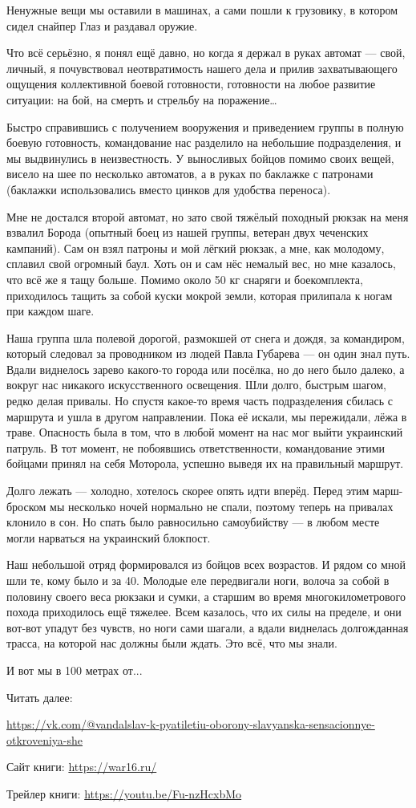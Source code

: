 Ненужные вещи мы оставили в машинах, а сами пошли к грузовику, в котором сидел
снайпер Глаз и раздавал оружие.

Что всё серьёзно, я понял ещё давно, но когда я держал в руках автомат — свой,
личный, я почувствовал неотвратимость нашего дела и прилив захватывающего
ощущения коллективной боевой готовности, готовности на любое развитие ситуации:
на бой, на смерть и стрельбу на поражение…

Быстро справившись с получением вооружения и приведением группы в полную боевую
готовность, командование нас разделило на небольшие подразделения, и мы
выдвинулись в неизвестность. У выносливых бойцов помимо своих вещей, висело на
шее по несколько автоматов, а в руках по баклажке с патронами (баклажки
использовались вместо цинков для удобства переноса).

Мне не достался второй автомат, но зато свой тяжёлый походный рюкзак на меня
взвалил Борода (опытный боец из нашей группы, ветеран двух чеченских кампаний).
Сам он взял патроны и мой лёгкий рюкзак, а мне, как молодому, сплавил свой
огромный баул. Хоть он и сам нёс немалый вес, но мне казалось, что всё же я
тащу больше. Помимо около 50 кг снаряги и боекомплекта, приходилось тащить за
собой куски мокрой земли, которая прилипала к ногам при каждом шаге.

Наша группа шла полевой дорогой, размокшей от снега и дождя, за командиром,
который следовал за проводником из людей Павла Губарева — он один знал путь.
Вдали виднелось зарево какого-то города или посёлка, но до него было далеко, а
вокруг нас никакого искусственного освещения. Шли долго, быстрым шагом, редко
делая привалы. Но спустя какое-то время часть подразделения сбилась с маршрута
и ушла в другом направлении. Пока её искали, мы пережидали, лёжа в траве.
Опасность была в том, что в любой момент на нас мог выйти украинский патруль. В
тот момент, не побоявшись ответственности, командование этими бойцами принял на
себя Моторола, успешно выведя их на правильный маршрут.

Долго лежать — холодно, хотелось скорее опять идти вперёд. Перед этим
марш-броском мы несколько ночей нормально не спали, поэтому теперь на привалах
клонило в сон. Но спать было равносильно самоубийству — в любом месте могли
нарваться на украинский блокпост.

Наш небольшой отряд формировался из бойцов всех возрастов. И рядом со мной шли
те, кому было и за 40. Молодые еле передвигали ноги, волоча за собой в половину
своего веса рюкзаки и сумки, а старшим во время многокилометрового похода
приходилось ещё тяжелее. Всем казалось, что их силы на пределе, и они вот-вот
упадут без чувств, но ноги сами шагали, а вдали виднелась долгожданная трасса,
на которой нас должны были ждать. Это всё, что мы знали.

И вот мы в 100 метрах от...

Читать далее: 

\url{https://vk.com/@vandalslav-k-pyatiletiu-oborony-slavyanska-sensacionnye-otkroveniya-she}

Сайт книги: \url{https://war16.ru/}

Трейлер книги: \url{https://youtu.be/Fu-nzHcxbMo}

